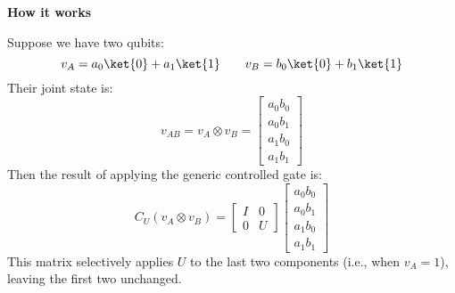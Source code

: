 \highspace
\begin{flushleft}
    \textcolor{Green3}{ \textbf{How it works}}
\end{flushleft}
Suppose we have two qubits:
\begin{equation*}
    v_{A} = a_{0} \ket{0} + a_{1} \ket{1} \hspace{2em} v_{B} = b_{0} \ket{0} + b_{1} \ket{1}
\end{equation*}
Their joint state is:
\begin{equation*}
    v_{AB} = v_{A} \otimes v_{B} = \begin{bmatrix}
        a_0 b_0 \\
        a_0 b_1 \\
        a_1 b_0 \\
        a_1 b_1
    \end{bmatrix}
\end{equation*}
Then the result of applying the generic controlled gate is:
\begin{equation*}
    C_{U} \left( v_{A} \otimes v_{B} \right) =
    \begin{bmatrix}
        I & 0 \\
        0 & U
    \end{bmatrix}
    \begin{bmatrix}
        a_0 b_0 \\
        a_0 b_1 \\
        a_1 b_0 \\
        a_1 b_1
    \end{bmatrix}
\end{equation*}
This matrix selectively applies $U$ to the last two components (i.e., when $v_{A} = 1$), leaving the first two unchanged.
